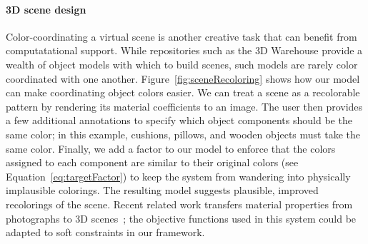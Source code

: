 \paragraph{3D scene design}
Color-coordinating a virtual scene is another creative task that can benefit from computatational support. While repositories such as the 3D Warehouse provide a wealth of object models with which to build scenes, such models are rarely color coordinated with one another. Figure~\ref{fig:sceneRecoloring} shows how our model can make coordinating object colors easier. We can treat a scene as a recolorable pattern by rendering its material coefficients to an image. The user then provides a few additional annotations to specify which object components should be the same color; in this example, cushions, pillows, and wooden objects must take the same color. Finally, we add a factor to our model to enforce that the colors assigned to each component are similar to their original colors (see Equation~\ref{eq:targetFactor}) to keep the system from wandering into physically implausible colorings. The resulting model suggests plausible, improved recolorings of the scene.
Recent related work transfers material properties from photographs to 3D scenes~\cite{MaterialStyleTransfer}; the objective functions used in this system could be adapted to soft constraints in our framework.

